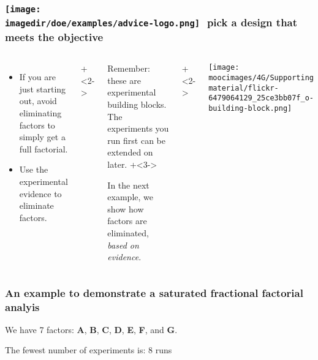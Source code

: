 \documentclass[handout,11pt,aspectratio=169,mathserif]{beamer}
\begin{document}
\begin{frame}\frametitle{\texttt{[image: \\imagedir/doe/examples/advice-logo.png]}\,\, pick a design that meets the objective}
	
	\begin{columns}[T]
		
			\begin{itemize}
				\item	If you are just starting out, avoid eliminating factors to simply get a full factorial.
				\item	Use the experimental evidence to eliminate factors.
			\end{itemize}
			
			
			\vspace{1cm}
			\onslide+<2->{
				\begin{itemize}
					\item	Remember: these are experimental building blocks. The experiments you run first can be extended on later.
					\vspace{0.5cm}
					\onslide+<3->{
						\item	In the next example, we show how factors are eliminated, {\color{myOrange}\emph{based on evidence}}.
					}
				\end{itemize}
			}
	
			\vspace{1cm}
			
			\onslide+<2->{
				\centerline{\texttt{[image: \\moocimages/4G/Supporting material/flickr-6479064129\_25ce3bb07f\_o-building-block.png]}}
		
			}
	\end{columns}
\end{frame}

\begin{frame}\frametitle{An example to demonstrate a saturated fractional factorial analyis}
	We have 7 factors: \textbf{A}, \textbf{B}, \textbf{C}, \textbf{D}, \textbf{E}, \textbf{F}, and \textbf{G}.
	
	\vspace{1cm}
	The fewest number of experiments is: 8 runs
	\vfill
\end{frame}
\end{document}
